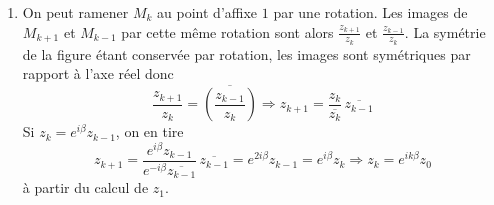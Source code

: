 \begin{enumerate}
\item On peut ramener $M_k$ au point d'affixe $1$ par une rotation. Les images de $M_{k+1}$ et $M_{k-1}$ par cette même rotation sont alors $\frac{z_{k+1}}{z_k}$ et $\frac{z_{k-1}}{z_k}$. La symétrie de la figure étant conservée par rotation, les images sont symétriques par rapport à l'axe réel donc
\begin{displaymath}
  \frac{z_{k+1}}{z_k} = \overline{\left( \frac{z_{k-1}}{z_k}\right) }
\Rightarrow
z_{k+1} = \frac{z_k}{\overline{z_k}}\, \overline{z_{k-1}}
\end{displaymath}
Si $z_k=e^{i\beta}z_{k-1}$, on en tire
\begin{displaymath}
  z_{k+1} = \frac{e^{i\beta} z_{k-1}}{e^{-i \beta} \overline{z_{k-1}}} \, \overline{z_{k-1}} = e^{2i\beta} z_{k-1} = e^{i\beta} z_k
  \Rightarrow z_k = e^{ik\beta} z_0
\end{displaymath}
à partir du calcul de $z_1$.
\end{enumerate}
